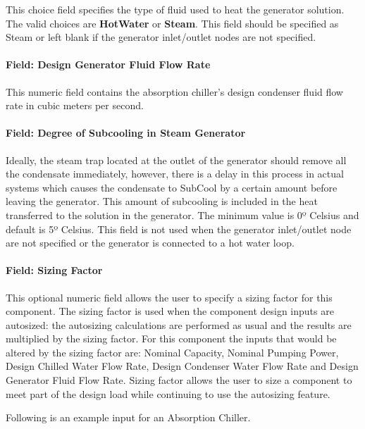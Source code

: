 This choice field specifies the type of fluid used to heat the generator solution. The valid choices are \textbf{HotWater} or \textbf{Steam}. This field should be specified as Steam or left blank if the generator inlet/outlet nodes are not specified.

\paragraph{Field: Design Generator Fluid Flow Rate}\label{field-design-generator-fluid-flow-rate}

This numeric field contains the absorption chiller's design condenser fluid flow rate in cubic meters per second.

\paragraph{Field: Degree of Subcooling in Steam Generator}\label{field-degree-of-subcooling-in-steam-generator}

Ideally, the steam trap located at the outlet of the generator should remove all the condensate immediately, however, there is a delay in this process in actual systems which causes the condensate to SubCool by a certain amount before leaving the generator. This amount of subcooling is included in the heat transferred to the solution in the generator. The minimum value is 0º Celsius and default is 5º Celsius. This field is not used when the generator inlet/outlet node are not specified or the generator is connected to a hot water loop.

\paragraph{Field: Sizing Factor}\label{field-sizing-factor-001}

This optional numeric field allows the user to specify a sizing factor for this component. The sizing factor is used when the component design inputs are autosized: the autosizing calculations are performed as usual and the results are multiplied by the sizing factor. For this component the inputs that would be altered by the sizing factor are: Nominal Capacity, Nominal Pumping Power, Design Chilled Water Flow Rate, Design Condenser Water Flow Rate and Design Generator Fluid Flow Rate. Sizing factor allows the user to size a component to meet part of the design load while continuing to use the autosizing feature.

Following is an example input for an Absorption Chiller.

